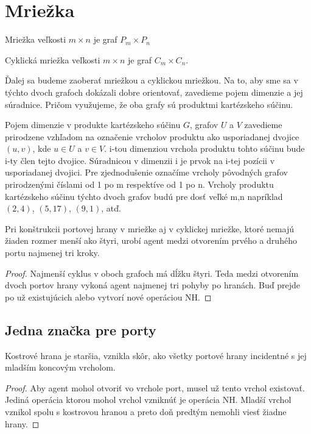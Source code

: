 \section{Mriežka}
\begin{defin}
Mriežka veľkosti $ m \times n$ je graf $P_{m} \times P_{n}$
\end{defin}
\begin{defin}
Cyklická mriežka veľkosti $m \times n$ je graf $C_{m} \times C_{n}$.
\end{defin}

Ďalej sa budeme zaoberať mriežkou a cyklickou mriežkou. Na to, aby sme sa v
týchto dvoch grafoch dokázali dobre orientovať, zavedieme pojem dimenzie a
jej súradnice. Pričom využujeme, že oba grafy sú produktmi kartézskeho
súčinu.
\begin{ozn}
Pojem dimenzie v produkte kartézskeho súčinu $G$, grafov $U$ a $V$ 
zavedieme prirodzene vzhľadom
na označenie vrcholov produktu ako usporiadanej dvojice $(u,v)$, kde $u \in
U$ a $v \in V$. i-tou dimenziou vrchola produktu tohto súčinu bude i-ty člen
tejto dvojice. Súradnicou v dimenzii i je prvok na i-tej pozícii v
usporiadanej dvojici. Pre zjednodušenie označíme vrcholy pôvodných grafov
prirodzenými číslami od 1 po m respektíve od 1 po n. Vrcholy produktu
kartézskeho súčinu týchto dvoch grafov budú pre dosť veľké m,n napríklad
$(2,4)$, $(5,17)$, $(9,1)$, atď.
\end{ozn}

\begin{lem}
Pri konštrukcii portovej hrany v mriežke aj v cyklickej mriežke, ktoré
nemajú žiaden rozmer menší ako štyri, 
urobí agent medzi otvorením prvého a druhého
portu najmenej tri kroky.
\end{lem}
\begin{proof}
Najmenší cyklus v oboch grafoch má dĺžku štyri. Teda medzi otvorením dvoch portov
hrany vykoná agent najmenej tri pohyby po hranách. Buď prejde po už
existujúcich alebo vytvorí nové operáciou NH.
\end{proof}

\subsection{Jedna značka pre porty}

\begin{lem}
Kostrové hrana je staršia, vznikla skôr, ako všetky portové hrany incidentné
s jej mladším koncovým vrcholom.
\end{lem}
\begin{proof}
Aby agent mohol otvoriť vo vrchole port, musel už tento vrchol existovať.
Jediná operácia ktorou mohol vrchol vzniknúť je operácia NH. Mladší vrchol
vznikol spolu s kostrovou hranou a preto doň predtým nemohli viesť žiadne
hrany.
\end{proof}

